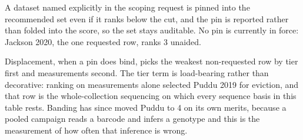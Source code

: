 A dataset named explicitly in the scoping request is pinned into the recommended set even
if it ranks below the cut, and the pin is reported rather than folded into the score, so
the set stays auditable. No pin is currently in force: Jackson 2020, the one requested row,
ranks 3 unaided.

Displacement, when a pin does bind, picks the weakest non-requested row by tier first and
measurements second. The tier term is load-bearing rather than decorative: ranking on
measurements alone selected Puddu 2019 for eviction, and that row is the whole-collection
sequencing on which every  sequence basis in this table rests. Banding has
since moved Puddu to 4 on its own merits, because a pooled campaign reads a barcode and
infers a genotype and this is the measurement of how often that inference is wrong.
